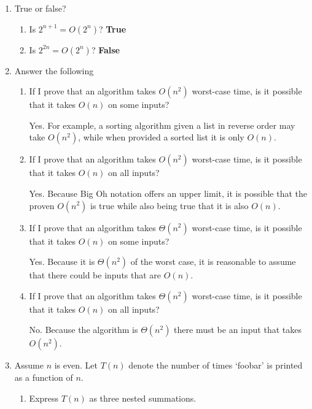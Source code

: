 \documentclass[12pt]{article}
\begin{document}
\begin{enumerate}
\item True or false?
    \begin{enumerate}
        \item Is $2^{n+1} = O(2^n)$? {\bf True}
        \item Is $2^{2n} = O(2^n)$? {\bf False}
    \end{enumerate}

\item Answer the following
    \begin{enumerate}
        \item If I prove that an algorithm takes $O(n^2)$ worst-case time,
        is it possible that it takes $O(n)$ on some inputs?

        Yes. For example, a sorting algorithm given a list in reverse order may take $O(n^2)$,
        while when provided a sorted list it is only $O(n)$.

        \item If I prove that an algorithm takes $O(n^2)$ worst-case time,
        is it possible that it takes $O(n)$ on all inputs?

        Yes. Because Big Oh notation offers an upper limit, it is possible that
        the proven $O(n^2)$ is true while also being true that it is also $O(n)$.

        \item If I prove that an algorithm takes $\Theta (n^2)$ worst-case time,
        is it possible that it takes $O(n)$ on some inputs?

        Yes. Because it is $\Theta (n^2)$ of the worst case, it is reasonable to
        assume that there could be inputs that are $O(n)$.

        \item If I prove that an algorithm takes $\Theta (n^2)$ worst-case time,
        is it possible that it takes $O(n)$ on all inputs?

        No. Because the algorithm is $\Theta (n^2)$ there must be an input that
        takes $O(n^2)$.
    \end{enumerate}

    \item Assume $n$ is even. Let $T(n)$ denote the number of times ‘foobar’ is
    printed as a function of $n$.

        \begin{enumerate}
            \item Express $T(n)$ as three nested summations.
            

\end{enumerate}
\end{enumerate}
\end{document}
